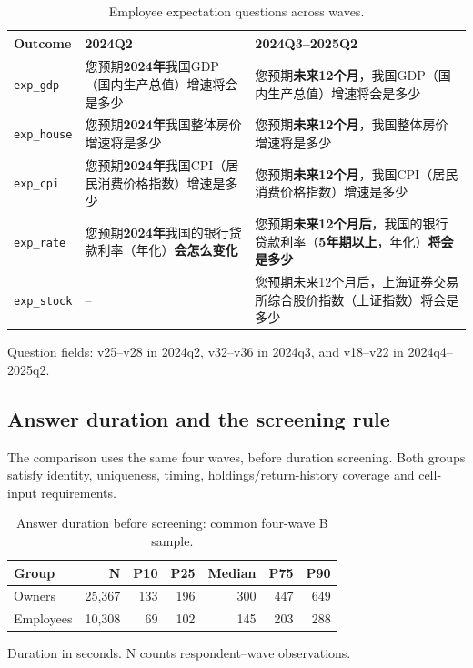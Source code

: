 \documentclass[11pt,letterpaper,english,final]{article}
\begin{document}
\begin{table}[H]
\centering\small
\setlength{\tabcolsep}{5pt}
\renewcommand{\arraystretch}{1.35}
\caption{Employee expectation questions across waves.}
\label{tab:employee-question-comparability}
\begin{tabularx}{\linewidth}{@{}lXX@{}}
\toprule
Outcome & 2024Q2 & 2024Q3--2025Q2 \\
\midrule
\texttt{exp\_gdp} & 您预期\textbf{2024年}我国GDP（国内生产总值）增速将会是多少 & 您预期\textbf{未来12个月}，我国GDP（国内生产总值）增速将会是多少 \\
\addlinespace
\texttt{exp\_house} & 您预期\textbf{2024年}我国整体房价增速将是多少 & 您预期\textbf{未来12个月}，我国整体房价增速将是多少 \\
\addlinespace
\texttt{exp\_cpi} & 您预期\textbf{2024年}我国CPI（居民消费价格指数）增速是多少 & 您预期\textbf{未来12个月}，我国CPI（居民消费价格指数）增速是多少 \\
\addlinespace
\texttt{exp\_rate} & 您预期\textbf{2024年}我国的银行贷款利率（年化）\textbf{会怎么变化} & 您预期\textbf{未来12个月后}，我国的银行贷款利率（\textbf{5年期以上}，年化）\textbf{将会是多少} \\
\addlinespace
\texttt{exp\_stock} & --  & 您预期未来12个月后，上海证券交易所综合股价指数（上证指数）将会是多少 \\
\bottomrule
\end{tabularx}
\par\vspace{5pt}\begin{minipage}{\linewidth}\footnotesize Question fields: v25--v28 in 2024q2, v32--v36 in 2024q3, and v18--v22 in 2024q4--2025q2.\end{minipage}
\end{table}

\subsection{Answer duration and the screening rule}
The comparison uses the same four waves, before duration screening. Both groups satisfy identity, uniqueness, timing, holdings/return-history coverage and cell-input requirements.

\begin{table}[H]
\centering\small
\setlength{\tabcolsep}{5pt}
\caption{Answer duration before screening: common four-wave B sample.}
\begin{tabular}{lrrrrrr}
\toprule
Group & N & P10 & P25 & Median & P75 & P90 \\
\midrule
Owners & 25,367 & 133 & 196 & 300 & 447 & 649 \\
Employees & 10,308 & 69 & 102 & 145 & 203 & 288 \\
\bottomrule
\end{tabular}
\par\vspace{4pt}\begin{minipage}{\linewidth}\footnotesize Duration in seconds. N counts respondent--wave observations.\end{minipage}
\end{table}
\end{document}
